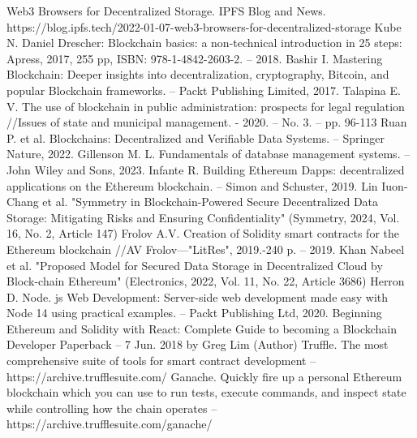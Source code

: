 \documentclass[10pt,conference,a4paper]{IEEEtran_EDM}
\begin{document}
\begin{thebibliography}{00}
 Web3 Browsers for Decentralized Storage. IPFS Blog and News. https://blog.ipfs.tech/2022-01-07-web3-browsers-for-decentralized-storage
 Kube N. Daniel Drescher: Blockchain basics: a non-technical introduction in 25 steps: Apress, 2017, 255 pp, ISBN: 978-1-4842-2603-2. – 2018.
 Bashir I. Mastering Blockchain: Deeper insights into decentralization, cryptography, Bitcoin, and popular Blockchain frameworks. – Packt Publishing Limited, 2017.
 Talapina E. V. The use of blockchain in public administration: prospects for legal regulation //Issues of state and municipal management. - 2020. – No. 3. – pp. 96-113
 Ruan P. et al. Blockchains: Decentralized and Verifiable Data Systems. – Springer Nature, 2022.
 Gillenson M. L. Fundamentals of database management systems. – John Wiley and Sons, 2023.
 Infante R. Building Ethereum Dapps: decentralized applications on the Ethereum blockchain. – Simon and Schuster, 2019.
 Lin Iuon-Chang et al. "Symmetry in Blockchain-Powered Secure Decentralized Data Storage: Mitigating Risks and Ensuring Confidentiality" (Symmetry, 2024, Vol. 16, No. 2, Article 147) 
 Frolov A.V. Creation of Solidity smart contracts for the Ethereum blockchain //AV Frolov—"LitRes", 2019.-240 p. – 2019.
 Khan Nabeel et al. "Proposed Model for Secured Data Storage in Decentralized Cloud by Block-chain Ethereum" (Electronics, 2022, Vol. 11, No. 22, Article 3686)  
 Herron D. Node. js Web Development: Server-side web development made easy with Node 14 using practical examples. – Packt Publishing Ltd, 2020.
 Beginning Ethereum and Solidity with React: Complete Guide to becoming a Blockchain Developer Paperback – 7 Jun. 2018 by Greg Lim (Author)
 Truffle. The most comprehensive suite of tools for smart contract development – https://archive.trufflesuite.com/
 Ganache. Quickly fire up a personal Ethereum blockchain which you can use to run tests, execute commands, and inspect state while controlling how the chain operates – https://archive.trufflesuite.com/ganache/
\end{thebibliography}
\end{document}
